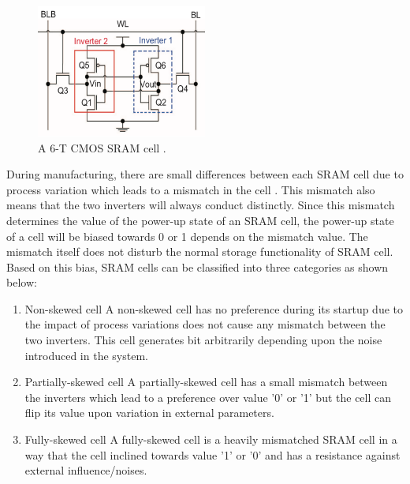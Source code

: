\begin{figure}[tph!]
    \centerline{\includegraphics[width={0.5\textwidth}]{images/sram_cell}}
    \caption{A 6-T CMOS SRAM cell \cite{modeling_sram}.}
    \label{fig:sram_cell}
\end{figure}

During manufacturing, there are small differences between each SRAM cell due to process variation which leads to a mismatch in the cell \cite{dargar_2011}. This mismatch also means that the two inverters will always conduct distinctly. Since this mismatch determines the value of the power-up state of an SRAM cell, the power-up state of a cell will be biased towards 0 or 1 depends on the mismatch value. The mismatch itself does not disturb the normal storage functionality of SRAM cell. Based on this bias, SRAM cells can be classified into three categories as shown below:

\begin{enumerate}
\item Non-skewed cell\newline
A non-skewed cell has no preference during its startup due to the impact of process variations does not cause any mismatch between the two inverters. This cell generates bit arbitrarily depending upon the noise introduced in the system.
\item Partially-skewed cell\newline
A partially-skewed cell has a small mismatch between the inverters which lead to a preference over value '0' or '1' but the cell can flip its value upon variation in external parameters.
\item Fully-skewed cell\newline
A fully-skewed cell is a heavily mismatched SRAM cell in a way that the cell inclined towards value '1' or '0' and has a resistance against external influence/noises.
\end{enumerate}


